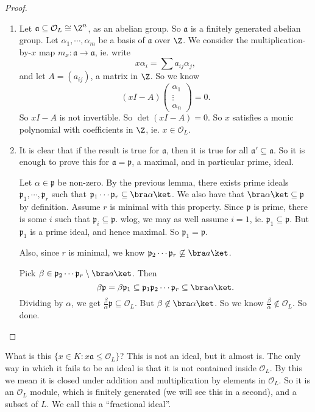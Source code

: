 \documentclass[a4paper]{article}
\begin{document}
\begin{proof}\leavevmode
  \begin{enumerate}
    \item Let $\mathfrak{a} \subseteq \mathcal{O}_L \cong \Z^n$, as an abelian group. So $\mathfrak{a}$ is a finitely generated abelian group. Let $\alpha_1, \cdots, \alpha_m$ be a basis of $\mathfrak{a}$ over $\Z$. We consider the multiplication-by-$x$ map $m_x: \mathfrak{a} \to \mathfrak{a}$, ie. write
      \[
        x\alpha_i = \sum a_{ij} \alpha_j,
      \]
      and let $A = (a_{ij})$, a matrix in $\Z$. So we know
      \[
        (xI - A)
        \begin{pmatrix}
          \alpha_1\\\vdots\\ \alpha_n
        \end{pmatrix}
        = 0.
      \]
      So $xI - A$ is not invertible. So $\det(xI - A) = 0$. So $x$ satisfies a monic polynomial with coefficients in $\Z$, ie. $x \in \mathcal{O}_L$.
    \item It is clear that if the result is true for $\mathfrak{a}$, then it is true for all $\mathfrak{a}' \subseteq \mathfrak{a}$. So it is enough to prove this for $\mathfrak{a} = \mathfrak{p}$, a maximal, and in particular prime, ideal.

      Let $\alpha \in \mathfrak{p}$ be non-zero. By the previous lemma, there exists prime ideals $\mathfrak{p}_1, \cdots, \mathfrak{p}_r$ such that $\mathfrak{p}_1 \cdots \mathfrak{p}_r \subseteq \bra \alpha\ket$. We also have that $\bra \alpha\ket \subseteq \mathfrak{p}$ by definition. Assume $r$ is minimal with this property. Since $\mathfrak{p}$ is prime, there is some $i$ such that $\mathfrak{p}_i \subseteq \mathfrak{p}$. wlog, we may as well assume $i = 1$, ie. $\mathfrak{p}_1 \subseteq \mathfrak{p}$. But $\mathfrak{p}_1$ is a prime ideal, and hence maximal. So $\mathfrak{p}_1 = \mathfrak{p}$.

      Also, since $r$ is minimal, we know $\mathfrak{p}_2 \cdots \mathfrak{p}_r \not\subseteq \bra a\ket$.

      Pick $\beta \in \mathfrak{p}_2 \cdots \mathfrak{p}_r \setminus \bra a\ket$. Then
      \[
        \beta \mathfrak{p} = \beta \mathfrak{p}_1 \subseteq \mathfrak{p}_1 \mathfrak{p}_2 \cdots \mathfrak{p}_r \subseteq \bra \alpha\ket.
      \]
      Dividing by $\alpha$, we get $\frac{\beta}{\alpha}\mathfrak{p} \subseteq \mathcal{O}_L$. But $\beta \not\in \bra \alpha\ket$. So we know $\frac{\beta}{\alpha} \not\in \mathcal{O}_L$. So done.
  \end{enumerate}
\end{proof}
What is this $\{x \in K: x \mathfrak{a} \leq \mathcal{O}_L\}$? This is not an ideal, but it almost is. The only way in which it fails to be an ideal is that it is not contained inside $\mathcal{O}_L$. By this we mean it is closed under addition and multiplication by elements in $\mathcal{O}_L$. So it is an $\mathcal{O}_L$ module, which is finitely generated (we will see this in a second), and a subset of $L$. We call this a ``fractional ideal''.
\end{document}
